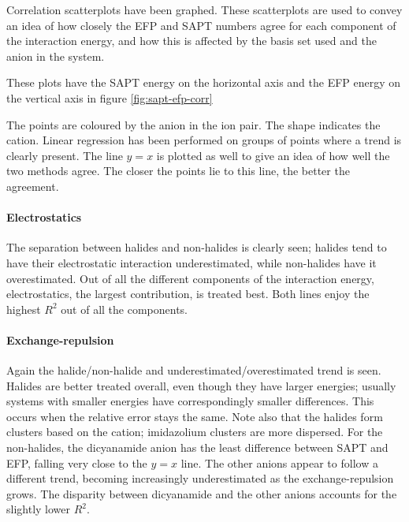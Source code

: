 

Correlation scatterplots have been graphed.
These scatterplots are used to convey an idea of how closely the EFP and SAPT numbers agree for each component of the interaction energy, and how this is affected by the basis set used and the anion in the system.


These plots have the SAPT energy on the horizontal axis and the EFP energy on the vertical axis in figure 
\ref{fig:sapt-efp-corr}

The points are coloured by the anion in the ion pair.
The shape indicates the cation.
Linear regression has been performed on groups of points where a trend is clearly present.
The line $ y = x $ is plotted as well to give an idea of how well the two methods agree.
The closer the points lie to this line, the better the agreement. 

\paragraph{Electrostatics}
The separation between halides and non-halides is clearly seen; halides tend to have their electrostatic interaction underestimated, while non-halides have it overestimated. 
Out of all the different components of the interaction energy, electrostatics, the largest contribution, is treated best. 
Both lines enjoy the highest $R^2$ out of all the components.

\paragraph{Exchange-repulsion}
Again the halide/non-halide and underestimated/overestimated trend is seen. 
Halides are better treated overall, even though they have larger energies; usually systems with smaller energies have correspondingly smaller differences.
This occurs when the relative error stays the same.
Note also that the halides form clusters based on the cation; imidazolium clusters are  more dispersed.
For the non-halides, the dicyanamide anion has the least difference between SAPT and EFP, falling very close to the $y = x$ line.
The other anions appear to follow a different trend, becoming increasingly underestimated as the exchange-repulsion grows.
The disparity between dicyanamide and the other anions accounts for the slightly lower $R^2$.

